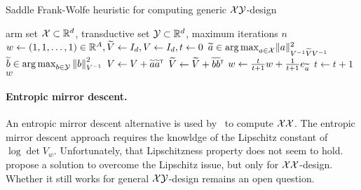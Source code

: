
\begin{algorithm}[ht]
\centering
\caption{Saddle Frank-Wolfe heuristic for computing generic $\mathcal{X}\mathcal{Y}$-design}
\label{alg:fw_ab}
\begin{algorithmic}
    arm set $\mathcal{X}\subset\mathbb{R}^d$, transductive set $\mathcal{Y}\subset\mathbb{R}^d$, maximum iterations $n$
    $w \leftarrow{} (1, 1, \ldots, 1)\in\mathbb{R}^A, \widetilde{V} \leftarrow{} I_d, V \leftarrow{} I_d, t \leftarrow{} 0$
        \State $\widetilde{a}\in\operatorname*{arg\,max}_{a\in\mathcal{X}}  \lVert a\rVert_{V^{-1} \widetilde{V} V^{-1} }^2$
        \State $\widetilde{b}\in\operatorname*{arg\,max}_{b\in\mathcal{Y}}\left\lVert b\right\rVert^2_{V^{-1}}$
        \State $V \leftarrow{} V + \widetilde{a}\widetilde{a}^{\mathsf{\scriptscriptstyle T}}$
		\State $\widetilde{V} \leftarrow{} \widetilde{V} + \widetilde{b}\widetilde{b}^{\mathsf{\scriptscriptstyle T}}$
        \State $w \leftarrow{} \frac{t}{t+1}w+\frac{1}{t+1}e_{\widetilde{a}}$
        \State $t \leftarrow{} t+1$
   \EndWhile
    $w$
\end{algorithmic}
\end{algorithm}

\paragraph{Entropic mirror descent.}
An entropic mirror descent alternative is used by~\citet{tao2018alba} to compute $\mathcal{X}\mathcal{X}$. The entropic mirror descent approach requires the knowldge of the Lipschitz constant of $\log\det V_w$. Unfortunately, that Lipschitzness property does not seem to hold. \citet{lu2018convex} propose a solution to overcome the Lipschitz issue, but only for $\mathcal{X}\mathcal{X}$-design. Whether it still works for general $\mathcal{X}\mathcal{Y}$-design remains an open question.

